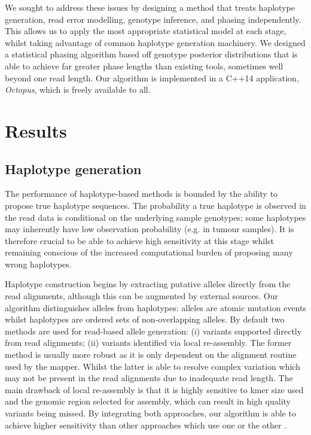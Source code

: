 \documentclass[notitlepage, twocolumn]{article}
\begin{document}
We sought to address these issues by designing a method that treats haplotype generation, read error modelling, genotype inference, and phasing independently. This allows us to apply the most appropriate statistical model at each stage, whilst taking advantage of common haplotype generation machinery. We designed a statistical phasing algorithm based off genotype posterior distributions that is able to achieve far greater phase lengths than existing tools, sometimes well beyond one read length. Our algorithm is implemented in a C++14 application, \textit{Octopus}, which is freely available to all.

\section*{Results}

\subsection*{Haplotype generation}

The performance of haplotype-based methods is bounded by the ability to propose true haplotype sequences. The probability a true haplotype is observed in the read data is conditional on the underlying sample genotypes; some haplotypes may inherently have low observation probability (e.g. in tumour samples). It is therefore crucial to be able to achieve high sensitivity at this stage whilst remaining conscious of the increased computational burden of proposing many wrong haplotypes.

Haplotype construction begins by extracting putative alleles directly from the read alignments, although this can be augmented by external sources. Our algorithm distinguishes alleles from haplotypes: alleles are atomic mutation events whilst haplotypes are ordered sets of non-overlapping alleles. By default two methods are used for read-based allele generation: (i) variants supported directly from read alignments; (ii) variants identified via local re-assembly. The former method is usually more robust as it is only dependent on the alignment routine used by the mapper. Whilst the latter is able to resolve complex variation which may not be present in the read alignments due to inadequate read length. The main drawback of local re-assembly is that it is highly sensitive to kmer size used and the genomic region selected for assembly, which can result in high quality variants being missed. By integrating both approaches, our algorithm is able to achieve higher sensitivity than other approaches which use one or the other \cite{RN141, RN538}.
\end{document}
